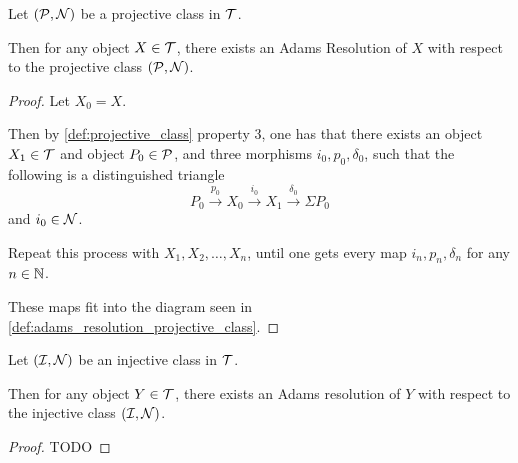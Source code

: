 \begin{theorem} %
    Let \( ({\mathcal{P}}, {\mathcal{N}}) \) be a projective class in \( {\mathcal{T}} \).

    Then for any object \( X \in {\mathcal{T}} \), there exists an Adams Resolution of \( X \) with respect to the projective class \( ({\mathcal{P}}, {\mathcal{N}}) \).
\end{theorem}
\begin{proof}
    Let \( X_0 = X \).

    Then by \autoref{def:projective_class} property 3, one has that there exists an object \( X_1 \in {\mathcal{T}} \) and object \( P_0 \in {\mathcal{P}} \), and three morphisms \( i_0, p_0, \delta_0 \), such that the following is a distinguished triangle
    \[
        P_0 \stackrel{p_0}{\longrightarrow} X_0 \stackrel{i_0}{\longrightarrow} X_1 \stackrel{\delta_0}{\longrightarrow} \Sigma P_0
    \]
    and \( i_0 \in {\mathcal{N}} \).

    Repeat this process with \( X_1, X_2, \dots, X_n \), until one gets every map \( i_n, p_n, \delta_n \) for any \( n \in {\mathbb{N}} \).

    These maps fit into the diagram seen in \autoref{def:adams_resolution_projective_class}.
\end{proof}

\begin{theorem} \label{thm:exists_adams_resolution_injective_class} %
    Let \( ({\mathcal{I}}, {\mathcal{N}}) \) be an injective class in \( {\mathcal{T}} \).

    Then for any object \( Y \in {\mathcal{T}} \), there exists an Adams resolution of \( Y \) with respect to the injective class \( ({\mathcal{I}}, {\mathcal{N}}) \).
\end{theorem}
\begin{proof}
    TODO
\end{proof}

